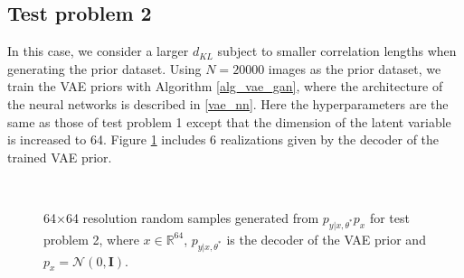 \subsection{Test problem 2}
In this case, we consider a larger $d_{KL}$ subject to smaller correlation lengths when generating the prior dataset. 
Using $N=20000$ images as the prior dataset, we train the VAE priors with Algorithm \ref{alg_vae_gan}, where the architecture of the neural
networks is described in \ref{vae_nn}. Here the hyperparameters are the same as those of test problem 1 %
except that the dimension of the latent variable is increased to 64. 
Figure \ref{samplesVAE_highdim} includes 6 realizations given by the decoder of the trained VAE prior. 
\begin{figure}
	\centering
	\quad
	\quad
	\\
	\quad
   \quad {}
	
	\caption{64×64 resolution random samples generated from $p_{y|x,\theta^*}p_x$ for test problem 2, where $x\in \mathbb{R}^{64}$, $p_{y|x,\theta^*}$ is the decoder of the VAE prior and  $p_x=\mathcal{N} (0, \mathbf{I})$.}
    \label{samplesVAE_highdim}
\end{figure}

